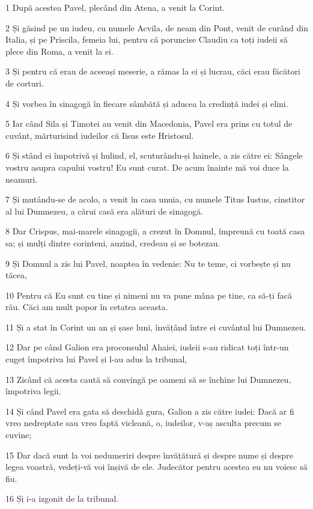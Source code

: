 \par 1 După acestea Pavel, plecând din Atena, a venit la Corint.
\par 2 Și găsind pe un iudeu, cu numele Acvila, de neam din Pont, venit de curând din Italia, și pe Priscila, femeia lui, pentru că poruncise Claudiu ca toți iudeii să plece din Roma, a venit la ei.
\par 3 Și pentru că erau de aceeași meserie, a rămas la ei și lucrau, căci erau făcători de corturi.
\par 4 Și vorbea în sinagogă în fiecare sâmbătă și aducea la credință iudei și elini.
\par 5 Iar când Sila și Timotei au venit din Macedonia, Pavel era prins cu totul de cuvânt, mărturisind iudeilor că Iisus este Hristosul.
\par 6 Și stând ei împotrivă și hulind, el, scuturându-și hainele, a zis către ei: Sângele vostru asupra capului vostru! Eu sunt curat. De acum înainte mă voi duce la neamuri.
\par 7 Și mutându-se de acolo, a venit în casa unuia, cu numele Titus Iustus, cinstitor al lui Dumnezeu, a cărui casă era alături de sinagogă.
\par 8 Dar Crispus, mai-marele sinagogii, a crezut în Domnul, împreună cu toată casa sa; și mulți dintre corinteni, auzind, credeau și se botezau.
\par 9 Și Domnul a zis lui Pavel, noaptea în vedenie: Nu te teme, ci vorbește și nu tăcea,
\par 10 Pentru că Eu sunt cu tine și nimeni nu va pune mâna pe tine, ca să-ți facă rău. Căci am mult popor în cetatea aceasta.
\par 11 Și a stat în Corint un an și șase luni, învățând între ei cuvântul lui Dumnezeu.
\par 12 Dar pe când Galion era proconsulul Ahaiei, iudeii s-au ridicat toți într-un cuget împotriva lui Pavel și l-au adus la tribunal,
\par 13 Zicând că acesta caută să convingă pe oameni să se închine lui Dumnezeu, împotriva legii.
\par 14 Și când Pavel era gata să deschidă gura, Galion a zis către iudei: Dacă ar fi vreo nedreptate sau vreo faptă vicleană, o, iudeilor, v-aș asculta precum se cuvine;
\par 15 Dar dacă sunt la voi nedumeriri despre învățătură și despre nume și despre legea voastră, vedeți-vă voi înșivă de ele. Judecător pentru acestea eu nu voiesc să fiu.
\par 16 Și i-a izgonit de la tribunal.
